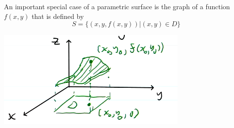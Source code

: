 \documentclass[11pt]{article}
\begin{document}
An important special case of a parametric surface is the graph of a function $f(x, y)$ that is defined by
\[ S = \{ (x,y, f(x,y)) | (x, y) \in D \} \]
\begin{center} \includegraphics[scale=1.5]{parametric_surface} \end{center}
\end{document}

